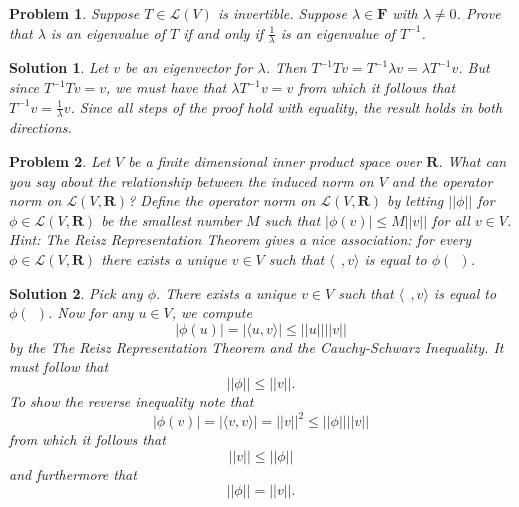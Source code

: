 \documentclass{article}
\theoremstyle{problemstyle}
\newtheorem{problem}{Problem}
\theoremstyle{problemstyle}
\newtheorem{solution}{Solution}
\theoremstyle{problemstyle}
\theoremstyle{problemstyle}
\begin{document}
\begin{problem}
Suppose $T \in \mathscr{L}(V)$ is invertible. Suppose $\lambda \in \textbf{F}$ with $\lambda\neq 0$. Prove that $\lambda$ is an eigenvalue of $T$ if and only if $\frac{1}{\lambda}$ is an eigenvalue of $T^{-1}$. 
\end{problem}

\begin{solution}
Let $v$ be an eigenvector for $\lambda$. Then $T^{-1}Tv = T^{-1}\lambda v = \lambda T^{-1}v$. But since $T^{-1}Tv = v$, we must have that $\lambda T^{-1}v = v$ from which it follows that $T^{-1}v = \frac{1}{\lambda}v$. Since all steps of the proof hold with equality, the result holds in both directions. 
\end{solution}

\begin{problem}
Let $V$ be a finite dimensional inner product space over $\textbf{R}$. What can you say about the relationship between the induced norm on $V$ and the operator norm on $\mathscr{L}(V,\textbf{R})$? Define the operator norm on $\mathscr{L}(V,\textbf{R})$ by letting $||\phi||$ for $\phi \in \mathscr{L}(V,\textbf{R})$ be the smallest number $M$ such that $|\phi(v)| \leq M||v||$ for all $v\in V$.\\ 

Hint: The Reisz Representation Theorem gives a nice association: for every $\phi \in \mathscr{L}(V,\textbf{R})$ there exists a unique $v \in V$ such that $\langle \ \  ,v\rangle$ is equal to $\phi( \ \ )$.  
\end{problem}

\begin{solution}
Pick any $\phi$. There exists a unique $v \in V$ such that $\langle \ \  ,v\rangle$ is equal to $\phi( \ \ )$. 
Now for any $u \in V$, we compute $$|\phi(u)| = |\langle u,v\rangle| \leq ||u||||v||$$ by the The Reisz Representation Theorem and the Cauchy-Schwarz Inequality. It must follow that $$||\phi|| \leq ||v||.$$ To show the reverse inequality note that $$|\phi(v)| = |\langle v,v\rangle| = ||v||^2 \leq ||\phi||||v||$$ from which it follows that $$||v|| \leq ||\phi||$$ and furthermore that $$||\phi|| = ||v||.$$
\end{solution}
\end{document}
